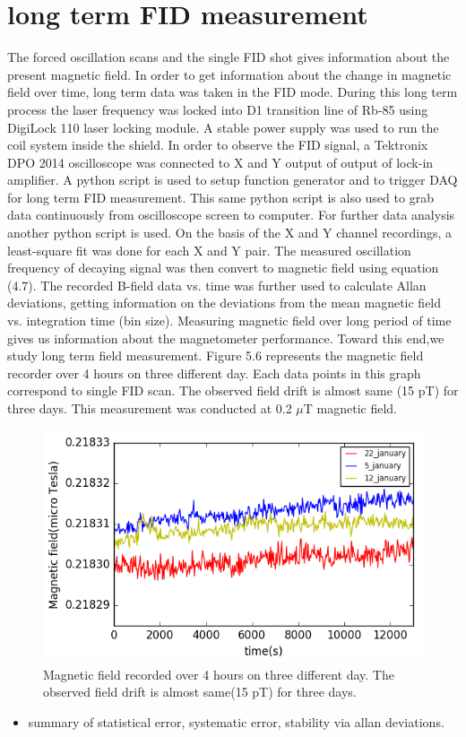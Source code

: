 \documentclass[12pt]{report}
\begin{document}
  \section{long term FID measurement}  
The forced oscillation scans and the single FID shot gives information about the present magnetic field. In order to get information about the change in magnetic field over time, long term data was taken in the FID mode. During this long term process the laser frequency was locked into D1 transition line of Rb-85 using DigiLock 110 laser locking module. A stable power supply was used to run the coil system inside the shield. In order to observe the FID signal, a Tektronix DPO 2014 oscilloscope was connected to X and Y output of output of lock-in amplifier. A python script is used to setup function generator and to trigger DAQ for long term FID measurement. This same python script is also used to grab data continuously from oscilloscope screen to computer. For further data analysis  another python script is used. On the basis of the X
and Y channel recordings, a least-square fit was done for each X and Y pair. The measured oscillation frequency of decaying signal was then convert to magnetic field using equation (4.7). The recorded B-field data vs. time was further used to calculate Allan deviations, getting  information on the deviations from the mean magnetic field vs. integration time (bin size). Measuring magnetic field over long period of time gives us information about the magnetometer performance. Toward this end,we study long term field measurement. Figure 5.6 represents the magnetic field recorder over 4 hours on three different day. Each data points in this graph correspond to single FID scan. The observed field drift is almost same (15 pT) for three days. This measurement was conducted at 0.2 $\mu$T magnetic field.
\begin{figure}[h]
\centering\includegraphics[width=0.85\linewidth]{figures/field_3_day}
\caption{Magnetic field recorded over 4 hours on three different day. The observed field drift is almost same(15 pT) for three days.}
\end{figure}
   \begin{itemize}
   \item summary of statistical error, systematic error, stability via allan deviations.
   \end{itemize}
   \newpage
\end{document}
